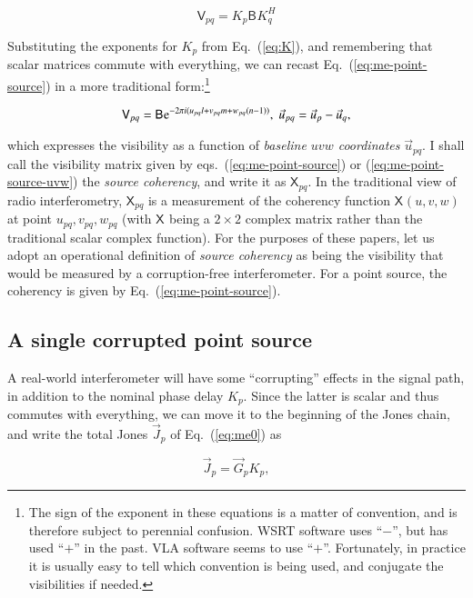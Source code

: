 \documentclass[referee]{aa}
\newcommand{\herm}{H}
\newcommand{\jones}[2]{\vec {#1}_{#2}}
\newcommand{\coh}[2]{\mathsf{{#1}}_{{#2}}}
\begin{document}
  \begin{equation}\label{eq:me-point-source}
  \coh{V}{pq} = K_p \coh{B}{}  K^\herm_q
  \end{equation}

Substituting the exponents for $K_p$ from Eq.~(\ref{eq:K}), and remembering that scalar matrices commute with everything, we can recast Eq.~(\ref{eq:me-point-source}) in a more traditional form:\footnote{The sign of the exponent in these equations is a matter of convention, and is therefore subject to perennial confusion. WSRT software uses ``$-$'', but has used ``$+$'' in the past. VLA software seems to use ``$+$''. Fortunately, in practice it is usually easy to tell which convention is being used, and conjugate the visibilities if needed.}

  \begin{equation}\label{eq:me-point-source-uvw}
  \coh{V}{pq} = \coh{B}{}  {\rm e}^{-2\pi i(u_{pq} l+v_{pq} m+w_{pq} (n-1))},\;\vec u_{pq} = \vec u_p - \vec u_q,
  \end{equation}
 
which expresses the visibility as a function of {\em baseline $uvw$ coordinates} $\vec u_{pq}$. I shall call the visibility matrix given by eqs.~(\ref{eq:me-point-source}) or (\ref{eq:me-point-source-uvw}) the {\em source coherency}, and write it as $\coh{X}{pq}$. In the traditional view of radio interferometry, $\coh{X}{pq}$ is a measurement of the coherency function $\coh{X}{}(u,v,w)$ at point $u_{pq},v_{pq},w_{pq}$ (with $\coh{X}{}$ being a $2\times2$ complex matrix rather than the traditional scalar complex function). For the purposes of these papers, let us adopt an operational definition of {\em source coherency} as being the visibility that would be measured by a corruption-free interferometer. For a point source, the coherency is given by Eq.~(\ref{eq:me-point-source}).

\subsection{A single corrupted point source}

A real-world interferometer will have some ``corrupting'' effects in the signal path, in addition to the nominal phase delay $K_p$. Since the latter is scalar and thus commutes with everything, we can move it to the beginning of the Jones chain, and write the total Jones $\jones{J}{p}$ of Eq.~(\ref{eq:me0}) as

\[
\jones{J}{p} = \jones{G}{p} K_p,
\]
\end{document}
